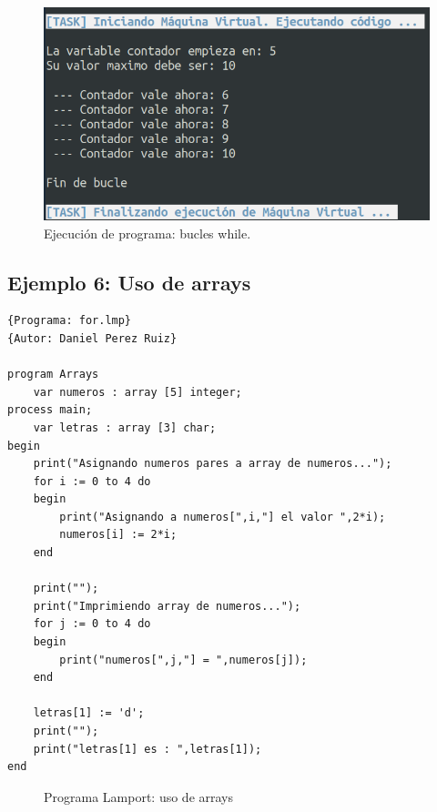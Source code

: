\newpage
\begin{figure}[h]
    \includegraphics[width=\linewidth]{images/ejemplos/while.png}
    \caption{Ejecución de programa: bucles while.}
    \label{fig:lamportWhile_exec}
\end{figure}

\newpage
\subsection{Ejemplo 6: Uso de arrays}
\begin{lstlisting}[style=lamportStyle]
{Programa: for.lmp}
{Autor: Daniel Perez Ruiz}

program Arrays
	var numeros : array [5] integer;
process main;
	var letras : array [3] char;
begin
	print("Asignando numeros pares a array de numeros...");
	for i := 0 to 4 do
	begin
		print("Asignando a numeros[",i,"] el valor ",2*i);
		numeros[i] := 2*i;
	end
	
	print("");
	print("Imprimiendo array de numeros...");
	for j := 0 to 4 do
	begin
		print("numeros[",j,"] = ",numeros[j]);
	end
	
	letras[1] := 'd';
	print("");
	print("letras[1] es : ",letras[1]);
end
\end{lstlisting}
\begin{figure}[h]
\caption{Programa Lamport: uso de arrays}
\label{fig:lamportArray}
\end{figure}

